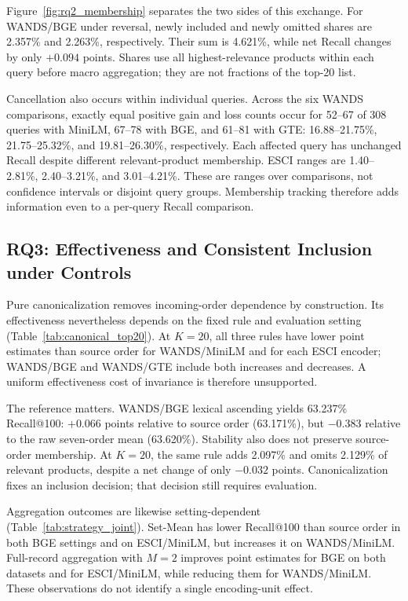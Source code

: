 Figure~\ref{fig:rq2_membership} separates the two sides of this exchange. For WANDS/\allowbreak BGE under reversal, newly included and newly omitted shares are 2.357\% and 2.263\%, respectively. Their sum is 4.621\%, while net Recall changes by only $+0.094$ points. Shares use all highest-relevance products within each query before macro aggregation; they are not fractions of the top-20 list.

Cancellation also occurs within individual queries. Across the six WANDS comparisons, exactly equal positive gain and loss counts occur for 52--67 of 308 queries with MiniLM, 67--78 with BGE, and 61--81 with GTE: 16.88--21.75\%, 21.75--25.32\%, and 19.81--26.30\%, respectively. Each affected query has unchanged Recall despite different relevant-product membership. ESCI ranges are 1.40--2.81\%, 2.40--3.21\%, and 3.01--4.21\%. These are ranges over comparisons, not confidence intervals or disjoint query groups. Membership tracking therefore adds information even to a per-query Recall comparison.

\subsection{RQ3: Effectiveness and Consistent Inclusion under Controls}
\label{sec:results_rq3}

Pure canonicalization removes incoming-order dependence by construction. Its effectiveness nevertheless depends on the fixed rule and evaluation setting (Table~\ref{tab:canonical_top20}). At $K=20$, all three rules have lower point estimates than source order for WANDS/\allowbreak MiniLM and for each ESCI encoder; WANDS/\allowbreak BGE and WANDS/\allowbreak GTE include both increases and decreases. A uniform effectiveness cost of invariance is therefore unsupported.



The reference matters. WANDS/\allowbreak BGE lexical ascending yields 63.237\% Recall@100: $+0.066$ points relative to source order (63.171\%), but $-0.383$ relative to the raw seven-order mean (63.620\%). Stability also does not preserve source-order membership. At $K=20$, the same rule adds 2.097\% and omits 2.129\% of relevant products, despite a net change of only $-0.032$ points. Canonicalization fixes an inclusion decision; that decision still requires evaluation.

Aggregation outcomes are likewise setting-dependent (Table~\ref{tab:strategy_joint}). Set-Mean has lower Recall@100 than source order in both BGE settings and on ESCI/\allowbreak MiniLM, but increases it on WANDS/\allowbreak MiniLM. Full-record aggregation with $M=2$ improves point estimates for BGE on both datasets and for ESCI/\allowbreak MiniLM, while reducing them for WANDS/\allowbreak MiniLM. These observations do not identify a single encoding-unit effect.

